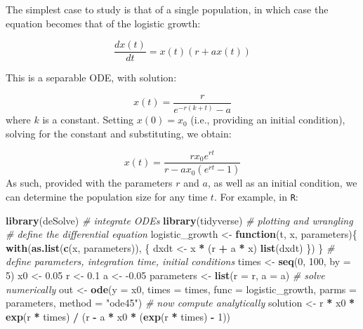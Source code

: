 \documentclass[
]{book}
\newenvironment{Shaded}{\begin{snugshade}}{\end{snugshade}}
\newcommand{\CommentTok}[1]{\textcolor[rgb]{0.56,0.35,0.01}{\textit{#1}}}
\newcommand{\ControlFlowTok}[1]{\textcolor[rgb]{0.13,0.29,0.53}{\textbf{#1}}}
\newcommand{\DataTypeTok}[1]{\textcolor[rgb]{0.13,0.29,0.53}{#1}}
\newcommand{\DecValTok}[1]{\textcolor[rgb]{0.00,0.00,0.81}{#1}}
\newcommand{\FloatTok}[1]{\textcolor[rgb]{0.00,0.00,0.81}{#1}}
\newcommand{\KeywordTok}[1]{\textcolor[rgb]{0.13,0.29,0.53}{\textbf{#1}}}
\newcommand{\NormalTok}[1]{#1}
\newcommand{\OperatorTok}[1]{\textcolor[rgb]{0.81,0.36,0.00}{\textbf{#1}}}
\newcommand{\StringTok}[1]{\textcolor[rgb]{0.31,0.60,0.02}{#1}}
\begin{document}
The simplest case to study is that of a single population, in which case the equation becomes that of the logistic growth:

\[
\dfrac{dx(t)}{dt} = x(t)(r + a x(t))
\]

This is a separable ODE, with solution:

\[
x(t) = \frac{r}{e^{-r \left(k+t\right)}-a}
\]
where \(k\) is a constant. Setting \(x(0) = x_0\) (i.e., providing an initial condition), solving for the constant and substituting, we obtain:

\[
x(t) = \frac{r {x_0} e^{r t}}{r-a {x_0} \left(e^{r t}-1\right)}
\]
As such, provided with the parameters \(r\) and \(a\), as well as an initial condition, we can determine the population size for any time \(t\). For example, in \texttt{R}:

\begin{Shaded}
\begin{Highlighting}[]
\KeywordTok{library}\NormalTok{(deSolve) }\CommentTok{# integrate ODEs}
\KeywordTok{library}\NormalTok{(tidyverse) }\CommentTok{# plotting and wrangling}
\CommentTok{# define the differential equation}
\NormalTok{logistic_growth <-}\StringTok{ }\ControlFlowTok{function}\NormalTok{(t, x, parameters)\{}
  \KeywordTok{with}\NormalTok{(}\KeywordTok{as.list}\NormalTok{(}\KeywordTok{c}\NormalTok{(x, parameters)), \{}
\NormalTok{    dxdt <-}\StringTok{ }\NormalTok{x }\OperatorTok{*}\StringTok{ }\NormalTok{(r }\OperatorTok{+}\StringTok{ }\NormalTok{a }\OperatorTok{*}\StringTok{ }\NormalTok{x)}
    \KeywordTok{list}\NormalTok{(dxdt)}
\NormalTok{  \})}
\NormalTok{\}}
\CommentTok{# define parameters, integration time, initial conditions}
\NormalTok{times <-}\StringTok{ }\KeywordTok{seq}\NormalTok{(}\DecValTok{0}\NormalTok{, }\DecValTok{100}\NormalTok{, }\DataTypeTok{by =} \DecValTok{5}\NormalTok{)}
\NormalTok{x0 <-}\StringTok{ }\FloatTok{0.05}
\NormalTok{r <-}\StringTok{ }\FloatTok{0.1}
\NormalTok{a <-}\StringTok{ }\FloatTok{-0.05}
\NormalTok{parameters <-}\StringTok{ }\KeywordTok{list}\NormalTok{(}\DataTypeTok{r =}\NormalTok{ r, }\DataTypeTok{a =}\NormalTok{ a)}
\CommentTok{# solve numerically}
\NormalTok{out <-}\StringTok{ }\KeywordTok{ode}\NormalTok{(}\DataTypeTok{y =}\NormalTok{ x0, }\DataTypeTok{times =}\NormalTok{ times, }
           \DataTypeTok{func =}\NormalTok{ logistic_growth, }\DataTypeTok{parms =}\NormalTok{ parameters, }
           \DataTypeTok{method =} \StringTok{"ode45"}\NormalTok{)}
\CommentTok{# now compute analytically}
\NormalTok{solution <-}\StringTok{ }\NormalTok{r }\OperatorTok{*}\StringTok{ }\NormalTok{x0 }\OperatorTok{*}\StringTok{ }\KeywordTok{exp}\NormalTok{(r }\OperatorTok{*}\StringTok{ }\NormalTok{times) }\OperatorTok{/}\StringTok{ }\NormalTok{(r }\OperatorTok{-}\StringTok{ }\NormalTok{a }\OperatorTok{*}\StringTok{ }\NormalTok{x0 }\OperatorTok{*}\StringTok{ }\NormalTok{(}\KeywordTok{exp}\NormalTok{(r }\OperatorTok{*}\StringTok{ }\NormalTok{times) }\OperatorTok{-}\StringTok{ }\DecValTok{1}\NormalTok{))}

\end{Highlighting}
\end{Shaded}
\end{document}
